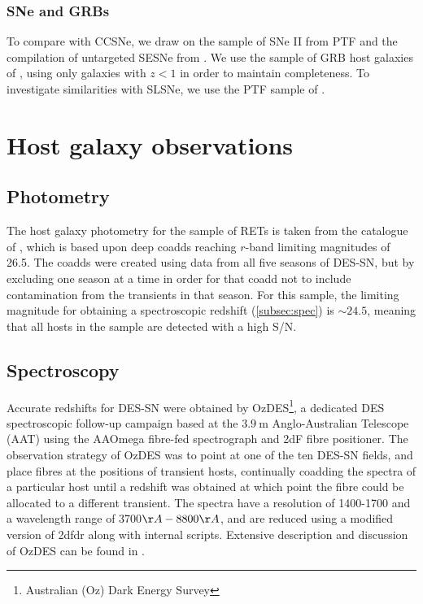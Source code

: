 \documentclass[fleqn,usenatbib,]{mnras}
\begin{document}
\subsubsection{SNe and GRBs \label{subsubsec:compare_CCSNe}}

To compare with CCSNe, we draw on the sample of SNe II from PTF \citep{Stoll2013} and the compilation of untargeted SESNe from \citet{Sanders2012}. We use the sample of GRB host galaxies of \citet{Kruehler2015}, using only galaxies with $z<1$ in order to maintain completeness. To investigate similarities with SLSNe, we use the PTF sample of \citet{Perley2016c}.

\section{Host galaxy observations \label{sec:obs}}
\subsection{Photometry \label{subsec:phot}}

The host galaxy photometry for the sample of RETs is taken from the catalogue of \citet{Wiseman2020}, which is based upon deep coadds reaching $r$-band limiting magnitudes of 26.5. The coadds were created using data from all five seasons of DES-SN, but by excluding one season at a time in order for that coadd not to include contamination from the transients in that season. For this sample, the limiting magnitude for obtaining a spectroscopic redshift (\ref{subsec:spec}) is $\sim 24.5$, meaning that all hosts in the sample are detected with a high S/N.

\subsection{Spectroscopy \label{subsec:spec}}
Accurate redshifts for DES-SN were obtained by OzDES\footnote{Australian (Oz) Dark Energy Survey}, a dedicated DES spectroscopic follow-up campaign based at the $3.9~\textrm{m}$ Anglo-Australian Telescope (AAT) using the AAOmega fibre-fed spectrograph and 2dF fibre positioner. The observation strategy of OzDES was to point at one of the ten DES-SN fields, and place fibres at the positions of transient hosts, continually coadding the spectra of a particular host until a redshift was obtained at which point the fibre could be allocated to a different transient. The spectra have a resolution of 1400-1700 and a wavelength range of 3700$\AA - 8800\AA$, and are reduced using a modified version of 2dfdr \citep{Croom2004} along with internal scripts. Extensive description and discussion of OzDES can be found in \citet{Yuan2015,Childress2017,Lidman2020}.
\end{document}
